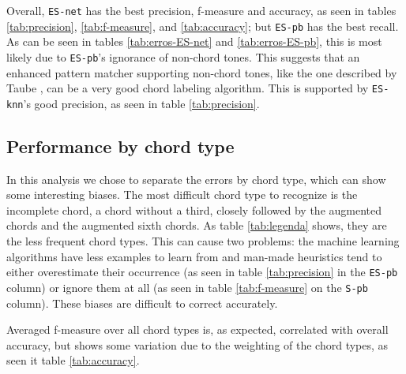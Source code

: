\documentclass{article}
\begin{document}
Overall, \texttt{ES-net} has the best precision, f-measure and
accuracy, as seen in tables \ref{tab:precision}, \ref{tab:f-measure},
and \ref{tab:accuracy}; but \texttt{ES-pb} has the best recall. As can
be seen in tables \ref{tab:erros-ES-net} and \ref{tab:erros-ES-pb},
this is most likely due to \texttt{ES-pb}'s ignorance of non-chord
tones. This suggests that an enhanced pattern matcher supporting
non-chord tones, like the one described by Taube
\cite{taube99:automatic}, can be a very good chord labeling
algorithm. This is supported by \texttt{ES-knn}'s good precision, as
seen in table \ref{tab:precision}.


\subsection{Performance by chord type}
\label{sec:chord-perf}

In this analysis we chose to separate the errors by chord type, which
can show some interesting biases. The most difficult chord type to
recognize is the incomplete chord, a chord without a third, closely
followed by the augmented chords and the augmented sixth chords. As
table \ref{tab:legenda} shows, they are the less frequent chord
types. This can cause two problems: the machine learning algorithms
have less examples to learn from and man-made heuristics tend to
either overestimate their occurrence (as seen in table
\ref{tab:precision} in the \texttt{ES-pb} column) or ignore them at
all (as seen in table \ref{tab:f-measure} on the \texttt{S-pb}
column). These biases are difficult to correct accurately.


Averaged f-measure over all chord types is, as expected, correlated
with overall accuracy, but shows some variation due to the weighting
of the chord types, as seen it table \ref{tab:accuracy}.
\end{document}
